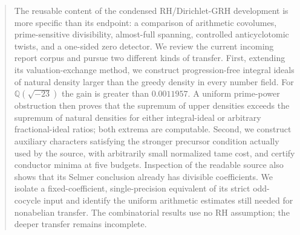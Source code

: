 \documentclass[11pt,a4paper]{article}
\theoremstyle{definition}\newtheorem{definition}[theorem]{Definition}
\theoremstyle{remark}\newtheorem{remark}[theorem]{Remark}
\newcommand{\Q}{\mathbb Q}\newcommand{\Z}{\mathbb Z}\newcommand{\N}{\mathbb N}
\begin{document}
\begin{abstract}
The reusable content of the condensed RH/Dirichlet-GRH development is
more specific than its endpoint: a comparison of arithmetic covolumes,
prime-sensitive divisibility, almost-full spanning, controlled
anticyclotomic twists, and a one-sided zero detector. We review the
current incoming report corpus and pursue two different kinds of
transfer. First, extending its valuation-exchange method, we construct
progression-free integral ideals of natural density larger than the
greedy density in every number field. For $\Q(\sqrt{-23})$ the gain is
greater than $0.0011957$. A uniform prime-power obstruction then proves
that the supremum of upper densities exceeds the supremum of natural
densities for either integral-ideal or arbitrary fractional-ideal
ratios; both extrema are computable. Second, we construct auxiliary
characters satisfying the stronger precursor condition actually used
by the source, with arbitrarily small normalized tame cost, and certify
conductor minima at five budgets. Inspection of the readable source
also shows that its Selmer conclusion already has divisible
coefficients. We isolate a fixed-coefficient, single-precision
equivalent of its strict odd-cocycle input and identify the uniform
arithmetic estimates still needed for nonabelian transfer. The
combinatorial results use no RH assumption; the deeper transfer
remains incomplete.
\end{abstract}
\tableofcontents
\newpage









\end{document}
